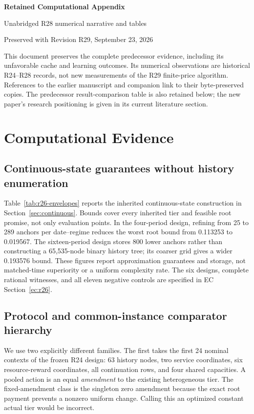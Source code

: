 \documentclass[11pt,letterpaper]{article}
\theoremstyle{definition}\newtheorem{assumption}[theorem]{Assumption}
\begin{document}
\begin{center}{\Large\bfseries Retained Computational Appendix}\par
Unabridged R28 numerical narrative and tables\par
Preserved with Revision R29, September 23, 2026\end{center}
This document preserves the complete predecessor evidence, including its unfavorable cache and learning outcomes. Its numerical observations are historical R24--R28 records, not new measurements of the R29 finite-price algorithm. References to the earlier manuscript and companion link to their byte-preserved copies. The predecessor result-comparison table is also retained below; the new paper's research positioning is given in its current literature section.

\section{Computational Evidence}\label{sec:evidence}

\subsection{Continuous-state guarantees without history enumeration}
Table~\ref{tab:r26-envelopes} reports the inherited continuous-state construction in Section~\ref{sec:continuous}. Bounds cover every inherited tier and feasible root promise, not only evaluation points. In the four-period design, refining from 25 to 289 anchors per date--regime reduces the worst root bound from 0.113253 to 0.019567. The sixteen-period design stores 800 lower anchors rather than constructing a 65,535-node binary history tree; its coarser grid gives a wider 0.193576 bound. These figures report approximation guarantees and storage, not matched-time superiority or a uniform complexity rate. The six designs, complete rational witnesses, and all eleven negative controls are specified in EC Section~\ref{ec:r26}.


\subsection{Protocol and common-instance comparator hierarchy}
We use two explicitly different families. The first takes the first 24 nominal contexts of the frozen R24 design: 63 history nodes, two service coordinates, six resource-reward coordinates, all continuation rows, and four shared capacities. A pooled action is an equal \emph{amendment} to the existing heterogeneous tier. The fixed-amendment class is the singleton zero amendment because the exact root payment prevents a nonzero uniform change. Calling this an optimized constant actual tier would be incorrect.
\end{document}

